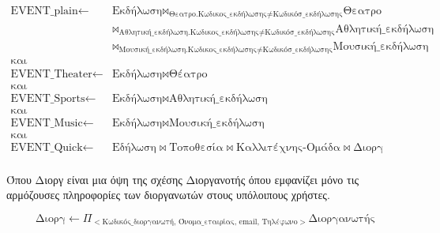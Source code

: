 \begin{equation}
  \begin{split}
    \text{EVENT\_plain} \leftarrow& \text{Εκδήλωση}
    \bowtie_{\text{Θεατρο.Κωδικος\_εκδήλωσης} \neq \text{Κωδικόσ\_εκδήλωσης}}
    \text{Θεατρο}\\
    &\bowtie_{\text{Αθλητική\_εκδήλωση.Κωδικος\_εκδήλωσης} \neq \text{Κωδικόσ\_εκδήλωσης}}
    \text{Αθλητική\_εκδήλωση}\\
    &\bowtie_{\text{Μουσική\_εκδήλωση.Κωδικος\_εκδήλωσης} \neq \text{Κωδικόσ\_εκδήλωσης}}
    \text{Μουσική\_εκδήλωση} \\
    \text{και}&\\
    \text{EVENT\_Theater} \leftarrow& \text{Εκδήλωση} \bowtie \text{Θέατρο} \\
    \text{και}&\\
    \text{EVENT\_Sports} \leftarrow& \text{Εκδήλωση} \bowtie \text{Αθλητική\_εκδήλωση} \\
    \text{και}&\\
    \text{EVENT\_Music} \leftarrow& \text{Εκδήλωση} \bowtie \text{Μουσική\_εκδήλωση} \\
    \text{και}&\\
    \text{EVENT\_Quick} \leftarrow& \text{Εδήλωση} \bowtie \text{Τοποθεσία} \bowtie
    \text{Καλλιτέχνης-Ομάδα} \bowtie \text{Διοργ} \\
  \end{split}
\end{equation}

Όπου Διοργ είναι μια όψη της σχέσης Διοργανοτής όπου εμφανίζει μόνο
τις αρμόζουσες πληροφορίες των διοργανωτών στους υπόλοιπους χρήστες.

\begin{equation}
  \text{Διοργ} \leftarrow \Pi_{<\text{Κωδικός\_διοργανωτή,
      Όνομα\_εταιρίας, email, Τηλέφωνο}>}\text{Διοργανωτής}
\end{equation}




  
